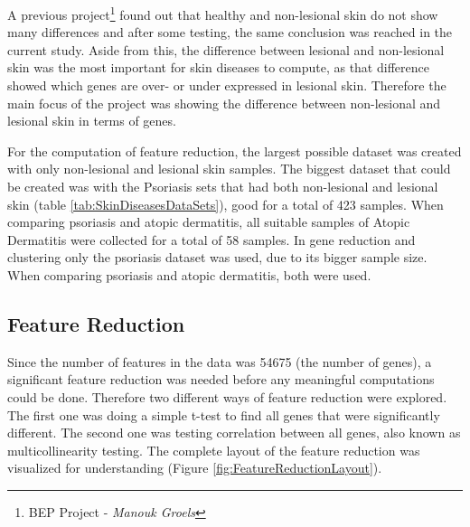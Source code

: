 \documentclass[10pt,a4paper]{report}
\begin{document}
	A previous project\footnote{BEP Project -\textit{ Manouk Groels}} found out that healthy and non-lesional skin do not show many differences and after some testing, the same conclusion was reached in the current study. Aside from this, the difference between lesional and non-lesional skin was the most important for skin diseases to compute, as that difference showed which genes are over- or under expressed in lesional skin. Therefore the main focus of the project was showing the difference between non-lesional and lesional skin in terms of genes. 
	
	For the computation of feature reduction, the largest possible dataset was created with only non-lesional and lesional skin samples. The biggest dataset that could be created was with the Psoriasis sets that had both non-lesional and lesional skin (table \ref{tab:SkinDiseasesDataSets}), good for a total of 423 samples. When comparing psoriasis and atopic dermatitis, all suitable samples of Atopic Dermatitis were collected for a total of 58 samples. In gene reduction and clustering only the psoriasis dataset was used, due to its bigger sample size. When comparing psoriasis and atopic dermatitis, both were used.
	
	\subsection{Feature Reduction}
	\label{subsec:MethodsFeatureReduction}
	
	Since the number of features in the data was 54675 (the number of genes), a significant feature reduction was needed before any meaningful computations could be done. Therefore two different ways of feature reduction were explored. The first one was doing a simple t-test to find all genes that were significantly different. The second one was testing correlation between all genes, also known as multicollinearity testing. The complete layout of the feature reduction was visualized for understanding (Figure \ref{fig:FeatureReductionLayout}).
	
\end{document}
